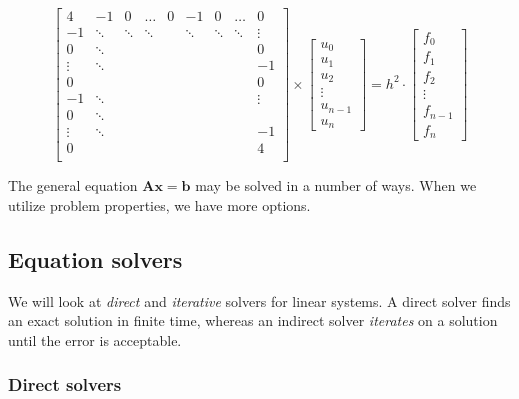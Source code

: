 \begin{equation}
  \begin{bmatrix}
    4 & -1      & 0 & \ldots & 0 & -1 & 0 & \ldots & 0 \\
    -1 & \ddots & \ddots & \ddots & & \ddots & \ddots & \ddots & \vdots \\
    0 & \ddots      &    & & & & & & 0 \\
    \vdots & \ddots & &    & & & & & -1 \\
    0 &       & & &    & & & & 0 \\
    -1 & \ddots     & & & &    & & & \vdots \\
    0 & \ddots      & & & & &    & & \\
    \vdots & \ddots & & & & & &    & -1 \\
    0 &       & & & & & & & 4 \\
  \end{bmatrix}
  \times
  \begin{bmatrix}
    u_0 \\ u_1 \\ u_2 \\ \vdots \\ u_{n-1} \\ u_n
  \end{bmatrix}
  =
  h^2 \cdot
  \begin{bmatrix}
    f_0 \\ f_1 \\ f_2 \\ \vdots \\ f_{n-1} \\ f_n
  \end{bmatrix}
\end{equation}

The general equation $\mathbf{A} \mathbf{x} = \mathbf{b}$ may be solved in a number of ways. When we utilize problem properties, we have more options.

\subsection{Equation solvers}
We will look at \emph{direct} and \emph{iterative} solvers for linear systems. A direct solver finds an exact solution in finite time, whereas an indirect solver \emph{iterates} on a solution until the error is acceptable.

\subsubsection{Direct solvers}
